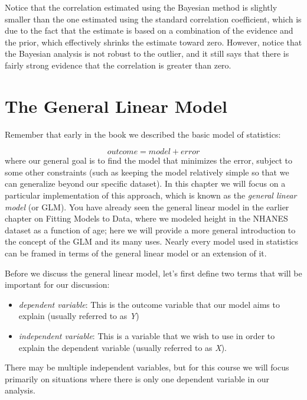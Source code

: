 \documentclass[12pt,]{book}
\providecommand{\tightlist}{%
  \setlength{\itemsep}{0pt}\setlength{\parskip}{0pt}}
\theoremstyle{definition}
\theoremstyle{definition}
\theoremstyle{definition}
\theoremstyle{remark}
\begin{document}
Notice that the correlation estimated using the Bayesian method is slightly smaller than the one estimated using the standard correlation coefficient, which is due to the fact that the estimate is based on a combination of the evidence and the prior, which effectively shrinks the estimate toward zero. However, notice that the Bayesian analysis is not robust to the outlier, and it still says that there is fairly strong evidence that the correlation is greater than zero.

\hypertarget{the-general-linear-model}{%
\chapter{The General Linear Model}\label{the-general-linear-model}}

Remember that early in the book we described the basic model of statistics:

\[
outcome = model + error
\]
where our general goal is to find the model that minimizes the error, subject to some other constraints (such as keeping the model relatively simple so that we can generalize beyond our specific dataset). In this chapter we will focus on a particular implementation of this approach, which is known as the \emph{general linear model} (or GLM). You have already seen the general linear model in the earlier chapter on Fitting Models to Data, where we modeled height in the NHANES dataset as a function of age; here we will provide a more general introduction to the concept of the GLM and its many uses. Nearly every model used in statistics can be framed in terms of the general linear model or an extension of it.

Before we discuss the general linear model, let's first define two terms that will be important for our discussion:

\begin{itemize}
\tightlist
\item
  \emph{dependent variable}: This is the outcome variable that our model aims to explain (usually referred to as \emph{Y})
\item
  \emph{independent variable}: This is a variable that we wish to use in order to explain the dependent variable (usually referred to as \emph{X}).
\end{itemize}

There may be multiple independent variables, but for this course we will focus primarily on situations where there is only one dependent variable in our analysis.
\end{document}
